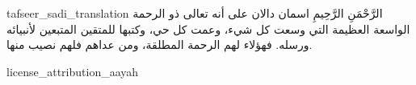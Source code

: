 \begin{taggedblock}{tafseer_sadi_translation}
{الرَّحْمَنِ الرَّحِيمِ}
اسمان دالان على أنه تعالى ذو الرحمة الواسعة العظيمة التي وسعت كل شيء، وعمت كل حي، وكتبها للمتقين المتبعين لأنبيائه ورسله. فهؤلاء لهم الرحمة المطلقة، ومن عداهم فلهم نصيب منها.
\end{taggedblock}
\begin{taggedblock}{license_attribution_aayah}

\end{taggedblock}
\begin{comment}
Please use the following for footnotes:- Sample\footnoteQ{Text of Qur'an footnote goes here.}.
Sample\footnoteT{Text of Tafseer footnote goes here.}.
\end{comment}